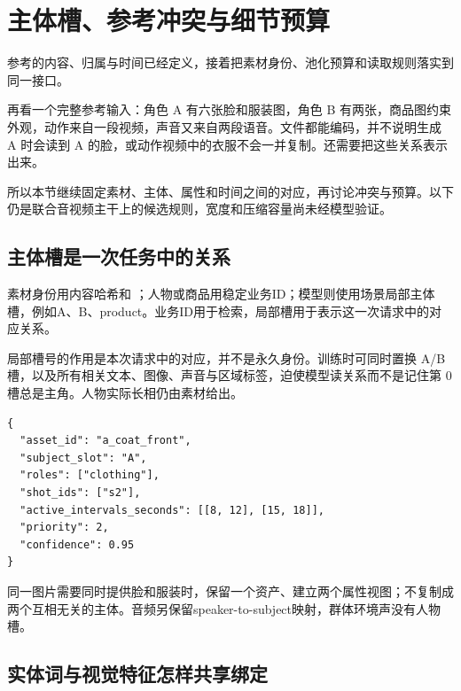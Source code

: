 \chapter{主体槽、参考冲突与细节预算}\label{seedance-m22}

参考的内容、归属与时间已经定义，接着把素材身份、池化预算和读取规则落实到同一接口。

再看一个完整参考输入：角色 A 有六张脸和服装图，角色 B 有两张，商品图约束外观，动作来自一段视频，声音又来自两段语音。文件都能编码，并不说明生成 A 时会读到 A 的脸，或动作视频中的衣服不会一并复制。还需要把这些关系表示出来。

所以本节继续固定素材、主体、属性和时间之间的对应，再讨论冲突与预算。以下仍是联合音视频主干上的候选规则，宽度和压缩容量尚未经模型验证。

\section{主体槽是一次任务中的关系}\label{seedance-m22-ux4e3bux4f53ux69fdux662fux4e00ux6b21ux4efbux52a1ux4e2dux7684ux5173ux7cfb}

素材身份用内容哈希和 ；人物或商品用稳定业务ID；模型则使用场景局部主体槽，例如A、B、product。业务ID用于检索，局部槽用于表示这一次请求中的对应关系。

局部槽号的作用是本次请求中的对应，并不是永久身份。训练时可同时置换 A/B 槽，以及所有相关文本、图像、声音与区域标签，迫使模型读关系而不是记住第 0 槽总是主角。人物实际长相仍由素材给出。

\begin{verbatim}
{
  "asset_id": "a_coat_front",
  "subject_slot": "A",
  "roles": ["clothing"],
  "shot_ids": ["s2"],
  "active_intervals_seconds": [[8, 12], [15, 18]],
  "priority": 2,
  "confidence": 0.95
}
\end{verbatim}

同一图片需要同时提供脸和服装时，保留一个资产、建立两个属性视图；不复制成两个互相无关的主体。音频另保留speaker-to-subject映射，群体环境声没有人物槽。

\section{实体词与视觉特征怎样共享绑定}\label{seedance-m22-ux5b9eux4f53ux8bcdux4e0eux89c6ux89c9ux7279ux5f81ux600eux6837ux5171ux4eabux7ed1ux5b9a}

